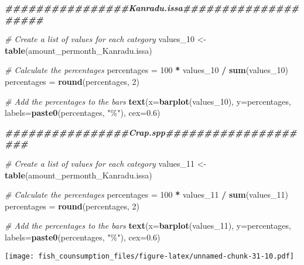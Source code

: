 \documentclass[
]{article}
\newenvironment{Shaded}{\begin{snugshade}}{\end{snugshade}}
\newcommand{\AttributeTok}[1]{\textcolor[rgb]{0.13,0.29,0.53}{#1}}
\newcommand{\CommentTok}[1]{\textcolor[rgb]{0.56,0.35,0.01}{\textit{#1}}}
\newcommand{\DecValTok}[1]{\textcolor[rgb]{0.00,0.00,0.81}{#1}}
\newcommand{\DocumentationTok}[1]{\textcolor[rgb]{0.56,0.35,0.01}{\textbf{\textit{#1}}}}
\newcommand{\FloatTok}[1]{\textcolor[rgb]{0.00,0.00,0.81}{#1}}
\newcommand{\FunctionTok}[1]{\textcolor[rgb]{0.13,0.29,0.53}{\textbf{#1}}}
\newcommand{\NormalTok}[1]{#1}
\newcommand{\OtherTok}[1]{\textcolor[rgb]{0.56,0.35,0.01}{#1}}
\newcommand{\SpecialCharTok}[1]{\textcolor[rgb]{0.81,0.36,0.00}{\textbf{#1}}}
\newcommand{\StringTok}[1]{\textcolor[rgb]{0.31,0.60,0.02}{#1}}
\begin{document}
\begin{Shaded}
\begin{Highlighting}[]
\DocumentationTok{\#\#\#\#\#\#\#\#\#\#\#\#\#\#\#\#Kanradu.issa\#\#\#\#\#\#\#\#\#\#\#\#\#\#\#\#\#\#\#\#}

\CommentTok{\# Create a list of values for each category}
\NormalTok{values\_10 }\OtherTok{\textless{}{-}} \FunctionTok{table}\NormalTok{(amount\_permonth\_Kanradu.issa)}

\CommentTok{\# Calculate the percentages}
\NormalTok{percentages }\OtherTok{=} \DecValTok{100} \SpecialCharTok{*}\NormalTok{ values\_10 }\SpecialCharTok{/} \FunctionTok{sum}\NormalTok{(values\_10)}
\NormalTok{percentages }\OtherTok{=} \FunctionTok{round}\NormalTok{(percentages, }\DecValTok{2}\NormalTok{)}

\CommentTok{\# Add the percentages to the bars}
\FunctionTok{text}\NormalTok{(}\AttributeTok{x=}\FunctionTok{barplot}\NormalTok{(values\_10), }\AttributeTok{y=}\NormalTok{percentages, }\AttributeTok{labels=}\FunctionTok{paste0}\NormalTok{(percentages, }\StringTok{"\%"}\NormalTok{), }\AttributeTok{cex=}\FloatTok{0.6}\NormalTok{)}


\DocumentationTok{\#\#\#\#\#\#\#\#\#\#\#\#\#\#\#\#Crap.spp\#\#\#\#\#\#\#\#\#\#\#\#\#\#\#\#\#\#\#\#}

\CommentTok{\# Create a list of values for each category}
\NormalTok{values\_11 }\OtherTok{\textless{}{-}} \FunctionTok{table}\NormalTok{(amount\_permonth\_Kanradu.issa)}

\CommentTok{\# Calculate the percentages}
\NormalTok{percentages }\OtherTok{=} \DecValTok{100} \SpecialCharTok{*}\NormalTok{ values\_11 }\SpecialCharTok{/} \FunctionTok{sum}\NormalTok{(values\_11)}
\NormalTok{percentages }\OtherTok{=} \FunctionTok{round}\NormalTok{(percentages, }\DecValTok{2}\NormalTok{)}

\CommentTok{\# Add the percentages to the bars}
\FunctionTok{text}\NormalTok{(}\AttributeTok{x=}\FunctionTok{barplot}\NormalTok{(values\_11), }\AttributeTok{y=}\NormalTok{percentages, }\AttributeTok{labels=}\FunctionTok{paste0}\NormalTok{(percentages, }\StringTok{"\%"}\NormalTok{), }\AttributeTok{cex=}\FloatTok{0.6}\NormalTok{)}
\end{Highlighting}
\end{Shaded}

\texttt{[image: fish\_counsumption\_files/figure-latex/unnamed-chunk-31-10.pdf]}
\end{document}
